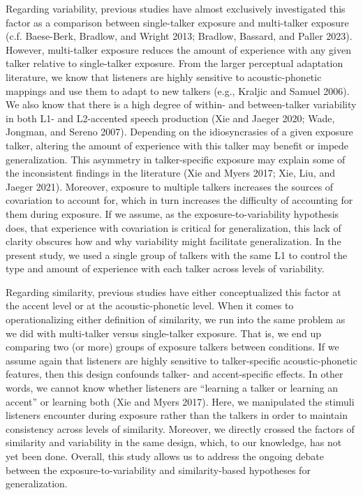 \documentclass[
  preprint]{elsarticle}
\begin{document}
Regarding variability, previous studies have almost exclusively investigated this factor as a comparison between single-talker exposure and multi-talker exposure (c.f. Baese-Berk, Bradlow, and Wright 2013; Bradlow, Bassard, and Paller 2023).
However, multi-talker exposure reduces the amount of experience with any given talker relative to single-talker exposure.
From the larger perceptual adaptation literature, we know that listeners are highly sensitive to acoustic-phonetic mappings and use them to adapt to new talkers (e.g., Kraljic and Samuel 2006).
We also know that there is a high degree of within- and between-talker variability in both L1- and L2-accented speech production (Xie and Jaeger 2020; Wade, Jongman, and Sereno 2007).
Depending on the idiosyncrasies of a given exposure talker, altering the amount of experience with this talker may benefit or impede generalization.
This asymmetry in talker-specific exposure may explain some of the inconsistent findings in the literature (Xie and Myers 2017; Xie, Liu, and Jaeger 2021).
Moreover, exposure to multiple talkers increases the sources of covariation to account for, which in turn increases the difficulty of accounting for them during exposure.
If we assume, as the exposure-to-variability hypothesis does, that experience with covariation is critical for generalization, this lack of clarity obscures how and why variability might facilitate generalization.
In the present study, we used a single group of talkers with the same L1 to control the type and amount of experience with each talker across levels of variability.

Regarding similarity, previous studies have either conceptualized this factor at the accent level or at the acoustic-phonetic level.
When it comes to operationalizing either definition of similarity, we run into the same problem as we did with multi-talker versus single-talker exposure.
That is, we end up comparing two (or more) groups of exposure talkers between conditions.
If we assume again that listeners are highly sensitive to talker-specific acoustic-phonetic features, then this design confounds talker- and accent-specific effects.
In other words, we cannot know whether listeners are ``learning a talker or learning an accent'' or learning both (Xie and Myers 2017).
Here, we manipulated the stimuli listeners encounter during exposure rather than the talkers in order to maintain consistency across levels of similarity.
Moreover, we directly crossed the factors of similarity and variability in the same design, which, to our knowledge, has not yet been done.
Overall, this study allows us to address the ongoing debate between the exposure-to-variability and similarity-based hypotheses for generalization.
\end{document}
